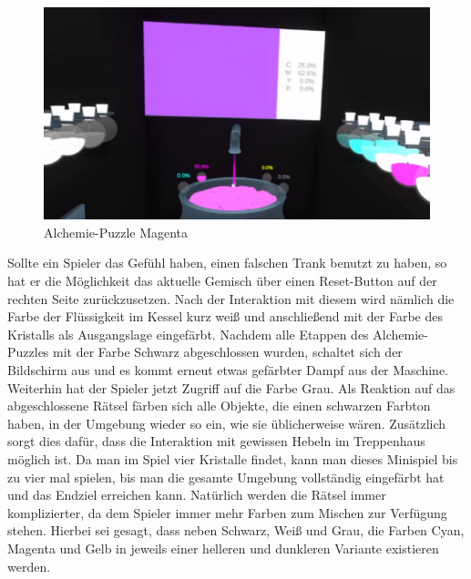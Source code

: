 \begin{figure}[h]
	\centering
	\includegraphics[width=\textwidth/2]{Pictures/Alchemie_Magenta}
	\caption{Alchemie-Puzzle Magenta}
	\label{fig:alchemie_magenta}
\end{figure}\newpage \noindent
Sollte ein Spieler das Gefühl haben, einen falschen Trank benutzt zu haben, so hat er die Möglichkeit das aktuelle Gemisch über einen Reset-Button auf der rechten Seite zurückzusetzen. Nach der Interaktion mit diesem wird nämlich die Farbe der Flüssigkeit im Kessel kurz weiß und anschließend mit der Farbe des Kristalls als Ausgangslage eingefärbt. Nachdem alle Etappen des Alchemie-Puzzles mit der Farbe Schwarz abgeschlossen wurden, schaltet sich der Bildschirm aus und es kommt erneut etwas gefärbter Dampf aus der Maschine. Weiterhin hat der Spieler jetzt Zugriff auf die Farbe Grau. Als Reaktion auf das abgeschlossene Rätsel färben sich alle Objekte, die einen schwarzen Farbton haben, in der Umgebung wieder so ein, wie sie üblicherweise wären. Zusätzlich sorgt dies dafür, dass die Interaktion mit gewissen Hebeln im Treppenhaus möglich ist. Da man im Spiel vier Kristalle findet, kann man dieses Minispiel bis zu vier mal spielen, bis man die gesamte Umgebung vollständig eingefärbt hat und das Endziel erreichen kann. Natürlich werden die Rätsel immer komplizierter, da dem Spieler immer mehr Farben zum Mischen zur Verfügung stehen. Hierbei sei gesagt, dass neben Schwarz, Weiß und Grau, die Farben Cyan, Magenta und Gelb in jeweils einer helleren und dunkleren Variante existieren werden.

